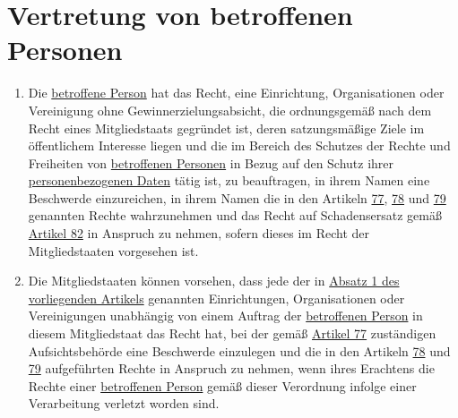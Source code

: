 \chapter{Vertretung von betroffenen Personen}
\label{ch:80}


\begin{enumerate}

  \item Die \hyperref[itm:04-1]{betroffene Person} hat das Recht, eine Einrichtung, Organisationen oder Vereinigung ohne
   Gewinnerzielungsabsicht, die ordnungsgemäß nach dem Recht eines Mitgliedstaats gegründet ist, deren satzungsmäßige
   Ziele im öffentlichem Interesse liegen und die im Bereich des Schutzes der Rechte und Freiheiten von \hyperref[itm:04-1]{betroffenen
   Personen} in Bezug auf den Schutz ihrer \hyperref[itm:04-1]{personenbezogenen Daten} tätig ist, zu beauftragen, in ihrem Namen eine
   Beschwerde einzureichen, in ihrem Namen die in den Artikeln \hyperref[ch:77]{77}, \hyperref[ch:78]{78} und \hyperref
   [ch:79]{79} genannten Rechte wahrzunehmen und das Recht auf Schadensersatz gemäß \hyperref[ch:82]{Artikel 82} in
   Anspruch zu nehmen, sofern dieses im Recht der Mitgliedstaaten vorgesehen ist.
  \label{itm:80-1}

  \item Die Mitgliedstaaten können vorsehen, dass jede der in \hyperref[itm:80-1]{Absatz 1 des vorliegenden Artikels}
   genannten Einrichtungen, Organisationen oder Vereinigungen unabhängig von einem Auftrag der \hyperref[itm:04-1]{betroffenen Person} in
   diesem Mitgliedstaat das Recht hat, bei der gemäß \hyperref[ch:77]{Artikel 77} zuständigen Aufsichtsbehörde eine
   Beschwerde einzulegen und die in den Artikeln \hyperref[ch:78]{78} und \hyperref[ch:79]{79} aufgeführten Rechte in
   Anspruch zu nehmen, wenn ihres Erachtens die Rechte einer \hyperref[itm:04-1]{betroffenen Person} gemäß dieser Verordnung infolge einer
   Verarbeitung verletzt worden sind.
  \label{itm:80-2}

\end{enumerate}


